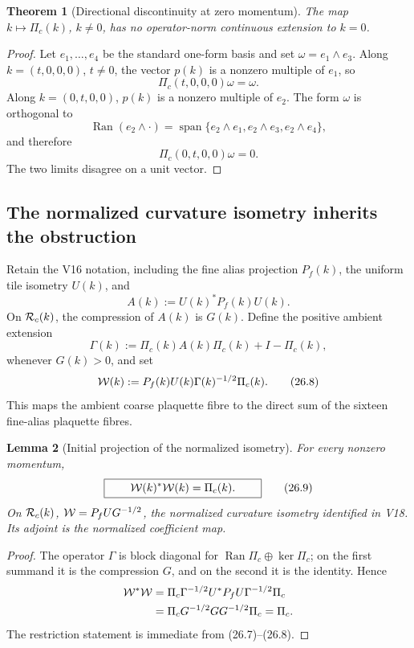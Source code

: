 \documentclass[11pt,oneside]{book}
\newtheorem{theorem}{Theorem}[chapter]
\newtheorem{lemma}[theorem]{Lemma}
\theoremstyle{definition}
\theoremstyle{remark}
\begin{document}
\begin{theorem}[Directional discontinuity at zero momentum]
\label{thm:e8v26-Hodge-discontinuity}
The map \(k\mapsto\Pi_c(k)\), \(k\ne0\), has no operator-norm
continuous extension to \(k=0\).
\end{theorem}

\begin{proof}
Let \(e_1,\ldots,e_4\) be the standard one-form basis and set
\(\omega=e_1\wedge e_3\).  Along \(k=(t,0,0,0)\), \(t\ne0\), the
vector \(p(k)\) is a nonzero multiple of \(e_1\), so
\[
                  \Pi_c(t,0,0,0)\omega=\omega.                   \tag{26.4}
\]
Along \(k=(0,t,0,0)\), \(p(k)\) is a nonzero multiple of \(e_2\).
The form \(\omega\) is orthogonal to
\[
 \operatorname{Ran}(e_2\wedge\cdot)
 =\operatorname{span}\{
 e_2\wedge e_1,e_2\wedge e_3,e_2\wedge e_4\},
\]
and therefore
\[
                  \Pi_c(0,t,0,0)\omega=0.                         \tag{26.5}
\]
The two limits disagree on a unit vector.
\end{proof}

\subsection{The normalized curvature isometry inherits the obstruction}

Retain the V16 notation, including the fine alias projection \(P_f(k)\),
the uniform tile isometry \(U(k)\), and
\[
                         A(k):=U(k)^*P_f(k)U(k).                  \tag{26.6}
\]
On \({\cal R}_c(k)\), the compression of \(A(k)\) is \(G(k)\).
Define the positive ambient extension
\[
 \Gamma(k):=\Pi_c(k)A(k)\Pi_c(k)+I-\Pi_c(k),                      \tag{26.7}
\]
whenever \(G(k)>0\), and set
\[
 {\cal W}(k):=
 P_f(k)U(k)\Gamma(k)^{-1/2}\Pi_c(k).                              \tag{26.8}
\]
This maps the ambient coarse plaquette fibre to the direct sum of the
sixteen fine-alias plaquette fibres.

\begin{lemma}[Initial projection of the normalized isometry]
\label{lem:e8v26-initial-projection}
For every nonzero momentum,
\[
\boxed{\qquad
                  {\cal W}(k)^*{\cal W}(k)=\Pi_c(k).
\qquad}                                                           \tag{26.9}
\]
On \({\cal R}_c(k)\), \({\cal W}=P_fUG^{-1/2}\), the normalized
curvature isometry identified in V18.  Its adjoint is the normalized
coefficient map.
\end{lemma}

\begin{proof}
The operator \(\Gamma\) is block diagonal for
\(\operatorname{Ran}\Pi_c\oplus\ker\Pi_c\); on the first summand it is
the compression \(G\), and on the second it is the identity.  Hence
\[
\begin{split}
 {\cal W}^*{\cal W}
 &=\Pi_c\Gamma^{-1/2}U^*P_fU\Gamma^{-1/2}\Pi_c\\
 &=\Pi_cG^{-1/2}GG^{-1/2}\Pi_c=\Pi_c.
\end{split}
\]
The restriction statement is immediate from (26.7)--(26.8).
\end{proof}
\end{document}
